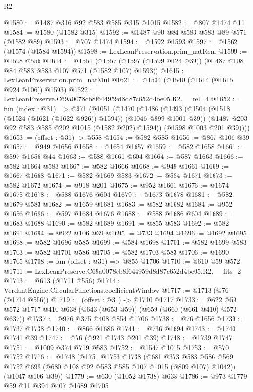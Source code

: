 \begin{lexlean}{R2}
\begin{coremodule}
@1580 := @1487 @316 @92 @583 @585 @315 @1015
@1582 := @807 @1474 @11
@1584 := @1580 (@1582 @315)
@1592 := @1487 @90 @84 @583 @583 @89 @571 (@1582 @89)
@1593 := @707 @1474
@1594 := @1592 @1593
@1597 := @1562 (@1574 (@1584 @1594))
@1598 := LexLeanPreservation.prim_natRem
@1599 := @1598 @556
@1614 := @1551
    (@1557 (@1597 (@1599 @124 @39)) (@1487 @108 @84 @583 @583 @107 @571 (@1582 @107) @1593))
@1615 := LexLeanPreservation.prim_natMul
@1621 := @1534 (@1540 (@1614 (@1615 @924 @106)) @1593)
@1622 := LexLeanPreserve.C69a0078cb8f644959d8d87c652d4be05.R2.__rel_4
@1652 := fun (index : @31) =>
  @971
    (@1051
      (@1470
        (@1486
          (@1493
            (@1504 (@1518 (@1524 (@1621 (@1622 @926)) @1594)) (@1046 @999 @1001 @39))
            (@1487 @203 @92 @583 @585 @202 @1015 (@1582 @202) @1594))
          (@1598 @1003 @201 @39))))
@1653 := (offset : @31) -> @558
@1654 := @582 @585
@1656 := @867 @106 @39
@1657 := @949 @1656
@1658 := @1654 @1657
@1659 := @582 @1658
@1661 := @597 @1656 @44
@1663 := @588 @1661 @604
@1664 := @587 @1663
@1666 := @582 @1664 @583
@1667 := @582 @1666
@1668 := @949 @1661
@1669 := @1667 @1668
@1671 := @582 @1669 @583
@1672 := @584 @1671
@1673 := @582 @1672
@1674 := @918 @201
@1675 := @952 @1661
@1676 := @1674 @1675
@1678 := @588 @1676 @604
@1679 := @1673 @1678
@1681 := @582 @1679 @583
@1682 := @1659 @1681
@1683 := @582 @1682
@1684 := @952 @1656
@1686 := @597 @1684 @1676
@1688 := @588 @1686 @604
@1689 := @1683 @1688
@1690 := @582 @1689
@1691 := @855 @583
@1692 := @582 @1691
@1694 := @922 @106 @39
@1695 := @733 @1694
@1696 := @1692 @1695
@1698 := @582 @1696 @585
@1699 := @584 @1698
@1701 := @582 @1699 @583
@1703 := @582 @1701 @586
@1705 := @582 @1703 @583
@1706 := @1690 @1705
@1708 := fun (offset : @31) => @855 @1706
@1710 := @610 @59 @572
@1711 := LexLeanPreserve.C69a0078cb8f644959d8d87c652d4be05.R2.__fits_2
@1713 := @613 (@1711 @556)
@1714 := VerdantEngine.CircularFunctions.coefficientWindow
@1717 := @1713 (@76 (@1714 @556))
@1719 := (offset : @31) -> @1710 @1717
@1733 := @622 @59 @572 @1717 @410 @638 (@643 (@653 @59)) (@659 (@660 (@661 @410) @572 @637))
@1737 := @976 @375 @408 @854 @1706
@1738 := @76 @1656
@1739 := @1737 @1738
@1740 := @866 @1686
@1741 := @736 @1694
@1743 := @1740 @1741 @39
@1747 := @76 (@921 @1743 @201 @39)
@1748 := @1739 @1747
@1751 := @1009 @374 @719 @583
@1752 := @1547 @1015
@1753 := @570 @1752
@1776 := @1748
    (@1751
      @1753
      @1738
      (@681 @373 @583 @586 @569 @1752 @698 (@680 @108 @92 @583 @585 @107 @1015 (@809 @107) @1042))
      (@1047 @106 @39))
@1779 := @630 (@1052 @1738) @638
@1786 := @973 @1779 @59 @11 @394 @407 @1689 @1705

\end{coremodule}
\end{lexlean}
